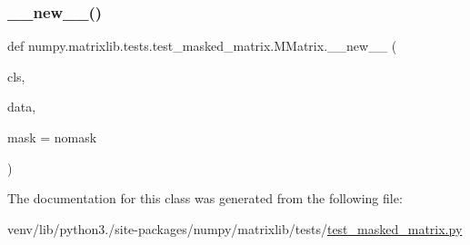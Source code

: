 \subsubsection{\texorpdfstring{\+\_\+\+\_\+new\+\_\+\+\_\+()}{\_\_new\_\_()}}
{\footnotesize\ttfamily def numpy.\+matrixlib.\+tests.\+test\+\_\+masked\+\_\+matrix.\+M\+Matrix.\+\_\+\+\_\+new\+\_\+\+\_\+ (\begin{DoxyParamCaption}\item[{}]{cls,  }\item[{}]{data,  }\item[{}]{mask = {\ttfamily nomask} }\end{DoxyParamCaption})}



The documentation for this class was generated from the following file\+:\begin{DoxyCompactItemize}
\item 
venv/lib/python3./site-\/packages/numpy/matrixlib/tests/\hyperlink{test__masked__matrix_8py}{test\+\_\+masked\+\_\+matrix.\+py}\end{DoxyCompactItemize}
